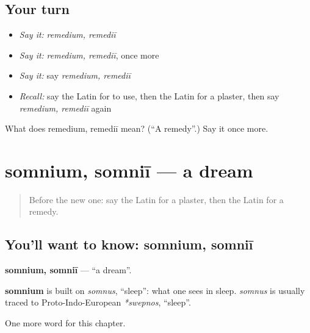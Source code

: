\subsection*{Your turn}
\begin{itemize}
\raggedright
  \item \emph{Say it:} \emph{remedium, remediī}
  \item \emph{Say it:} \emph{remedium, remediī}, once more
  \item \emph{Say it:} say \emph{remedium, remediī}
  \item \emph{Recall:} say the Latin for to use, then the Latin for a plaster, then say \emph{remedium, remediī} again
\end{itemize}

\begin{tcolorbox}[breakable,colback=teal!4,colframe=teal!35!black,title={Before you move on}]
What does remedium, remediī mean? (\textquotedblleft{}A remedy\textquotedblright{}.) Say it once more.
\end{tcolorbox}
\section[somnium, somniī]{somnium, somniī — a dream}

\label{lesson:LA-C236-somnium}



\begin{quote}
Before the new one: say the Latin for a plaster, then the Latin for a remedy.
\end{quote}

\subsection*{You'll want to know: somnium, somniī}
\textbf{somnium, somniī} — \textquotedblleft{}a dream\textquotedblright{}.

\begin{cousinweb}
\textbf{somnium} is built on \emph{somnus}, \textquotedblleft{}sleep\textquotedblright{}: what one sees in sleep. \emph{somnus} is usually traced to Proto-Indo-European \emph{*swepnos}, \textquotedblleft{}sleep\textquotedblright{}.
\end{cousinweb}

\begin{grammarlens}[title={What you've built}]
One more word for this chapter.
\end{grammarlens}

